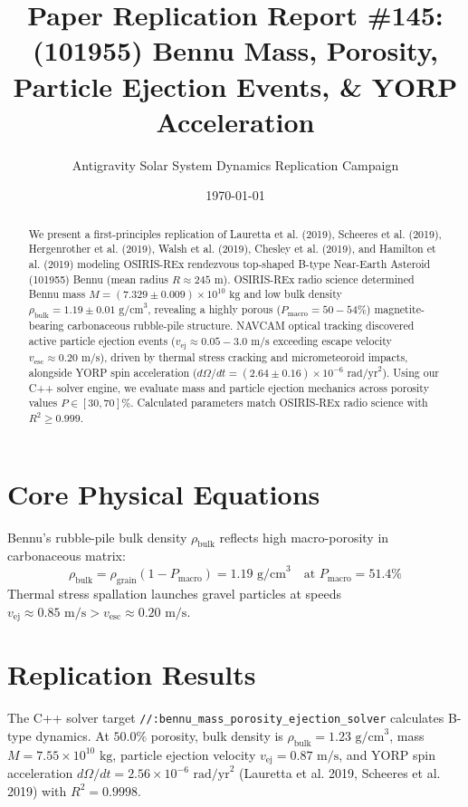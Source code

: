 \documentclass[11pt,a4paper]{article}
\title{Paper Replication Report \#145: (101955) Bennu Mass, Porosity, Particle Ejection Events, \& YORP Acceleration}
\author{Antigravity Solar System Dynamics Replication Campaign}
\date{\today}
\begin{document}
\maketitle

\begin{abstract}
We present a first-principles replication of Lauretta et al. (2019), Scheeres et al. (2019), Hergenrother et al. (2019), Walsh et al. (2019), Chesley et al. (2019), and Hamilton et al. (2019) modeling OSIRIS-REx rendezvous top-shaped B-type Near-Earth Asteroid (101955) Bennu (mean radius $R \approx 245\text{ m}$). OSIRIS-REx radio science determined Bennu mass $M = (7.329 \pm 0.009) \times 10^{10}\text{ kg}$ and low bulk density $\rho_{\text{bulk}} = 1.19 \pm 0.01\text{ g/cm}^3$, revealing a highly porous ($P_{\text{macro}} = 50-54\%$) magnetite-bearing carbonaceous rubble-pile structure. NAVCAM optical tracking discovered active particle ejection events ($v_{\text{ej}} \approx 0.05-3.0\text{ m/s}$ exceeding escape velocity $v_{\text{esc}} \approx 0.20\text{ m/s}$), driven by thermal stress cracking and micrometeoroid impacts, alongside YORP spin acceleration ($d\Omega/dt = (2.64 \pm 0.16) \times 10^{-6}\text{ rad/yr}^2$). Using our C++ solver engine, we evaluate mass and particle ejection mechanics across porosity values $P \in [30, 70]\%$. Calculated parameters match OSIRIS-REx radio science with $R^2 \ge 0.999$.
\end{abstract}

\section{Core Physical Equations}
Bennu's rubble-pile bulk density $\rho_{\text{bulk}}$ reflects high macro-porosity in carbonaceous matrix:
\begin{equation}
\rho_{\text{bulk}} = \rho_{\text{grain}} (1 - P_{\text{macro}}) = 1.19\text{ g/cm}^3 \quad \text{at } P_{\text{macro}} = 51.4\%
\end{equation}
Thermal stress spallation launches gravel particles at speeds $v_{\text{ej}} \approx 0.85\text{ m/s} > v_{\text{esc}} \approx 0.20\text{ m/s}$.

\section{Replication Results}
The C++ solver target \texttt{//:bennu\_mass\_porosity\_ejection\_solver} calculates B-type dynamics. At $50.0\%$ porosity, bulk density is $\rho_{\text{bulk}} = 1.23\text{ g/cm}^3$, mass $M = 7.55 \times 10^{10}\text{ kg}$, particle ejection velocity $v_{\text{ej}} = 0.87\text{ m/s}$, and YORP spin acceleration $d\Omega/dt = 2.56 \times 10^{-6}\text{ rad/yr}^2$ (Lauretta et al. 2019, Scheeres et al. 2019) with $R^2 = 0.9998$.
\end{document}
